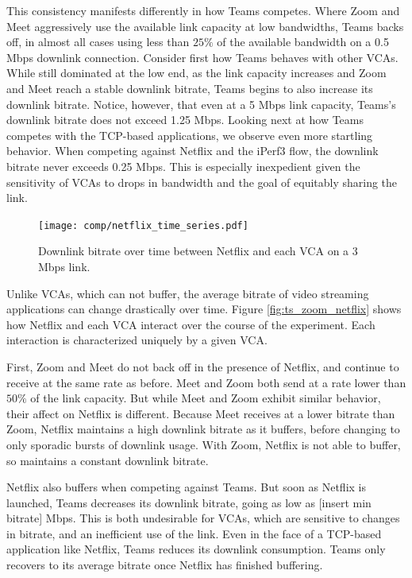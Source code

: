This consistency manifests differently in how Teams competes. 
Where Zoom and Meet aggressively use the available link capacity at low bandwidths, Teams backs off, in almost all cases using less than $25\%$ of the available bandwidth on a 0.5 Mbps downlink connection. Consider first how Teams behaves with other VCAs. While still dominated at the low end, as the link capacity increases and Zoom and Meet reach a stable downlink bitrate, Teams begins to also increase its downlink bitrate. Notice, however, that even at a 5 Mbps link capacity, Teams's downlink bitrate does not exceed 1.25 Mbps. Looking next at how Teams competes with the TCP-based applications, we observe even more startling behavior. When competing against Netflix and the iPerf3 flow, the downlink bitrate never exceeds 0.25 Mbps. This is especially inexpedient given the sensitivity of VCAs to drops in bandwidth and the goal of equitably sharing the link.  

  \begin{figure}[th]
    \texttt{[image: comp/netflix\_time\_series.pdf]}
    \caption{Downlink bitrate over time between Netflix and each VCA on a 3 Mbps link.}
	\label{fig:ts_comp_netflix}
\end{figure}
  
Unlike VCAs, which can not buffer, the average bitrate of video streaming applications can change drastically over time. Figure \ref{fig:ts_zoom_netflix} shows how Netflix and each VCA interact over the course of the experiment. Each interaction is characterized uniquely by a given VCA. 

First, Zoom and Meet do not back off in the presence of Netflix, and continue to receive at the same rate as before. Meet and Zoom both send at a rate lower than $50\%$ of the link capacity. But while Meet and Zoom exhibit similar behavior, their affect on Netflix is different. Because Meet receives at a lower bitrate than Zoom, Netflix maintains a high downlink bitrate as it buffers, before changing to only sporadic bursts of downlink usage. With Zoom, Netflix is not able to buffer, so maintains a constant downlink bitrate. 

Netflix also buffers when competing against Teams. But soon as Netflix is launched, Teams decreases its downlink bitrate, going as low as [insert min bitrate] Mbps. This is both undesirable for VCAs, which are sensitive to changes in bitrate, and an inefficient use of the link. Even in the face of a TCP-based application like Netflix, Teams reduces its downlink consumption. Teams only recovers to its average bitrate once Netflix has finished buffering. 



